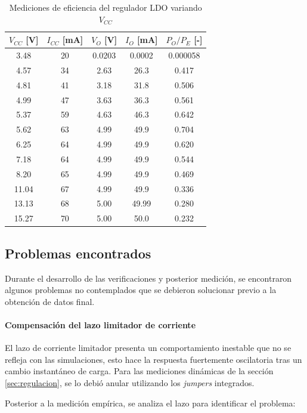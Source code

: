 \documentclass[]{article}
\begin{document}
\begin{table}[H]
	\centering
	\caption{Mediciones de eficiencia del regulador LDO variando $V_{CC}$}
	\begin{tabular}{|c|c|c|c|c|}
		\hline
		\textbf{$V_{CC}$ [V]} &
		\textbf{$I_{CC}$ [mA]} &
		\textbf{$V_O$ [V]} &
		\textbf{$I_O$ [mA]} &
		\textbf{$P_O/P_E$ [-]} \\
		\hline
		
		3.48  & 20 & 0.0203 & 0.0002 & 0.000058 \\
		4.57  & 34 & 2.63   & 26.3   & 0.417 \\
		4.81  & 41 & 3.18   & 31.8   & 0.506 \\
		4.99  & 47 & 3.63   & 36.3   & 0.561 \\
		5.37  & 59 & 4.63   & 46.3   & 0.642 \\
		5.62  & 63 & 4.99   & 49.9   & 0.704 \\
		6.25  & 64 & 4.99   & 49.9   & 0.620 \\
		7.18  & 64 & 4.99   & 49.9   & 0.544 \\
		8.20  & 65 & 4.99   & 49.9   & 0.469 \\
		11.04 & 67 & 4.99   & 49.9   & 0.336 \\
		13.13 & 68 & 5.00   & 49.99  & 0.280 \\
		15.27 & 70 & 5.00   & 50.0   & 0.232 \\
		\hline
	\end{tabular}
	\label{tab:eficiencia_ldo}
\end{table}

	\subsection{Problemas encontrados}
	Durante el desarrollo de las verificaciones y posterior medición, se encontraron algunos problemas no contemplados que se debieron solucionar previo a la obtención de datos final.
	\paragraph{Compensación del lazo limitador de corriente}\hfill\break
	El lazo de corriente limitador presenta un comportamiento inestable que no se refleja con las simulaciones, esto hace la respuesta fuertemente oscilatoria tras un cambio instantáneo de carga. Para las mediciones dinámicas de la sección \ref{sec:regulacion}, se lo debió anular utilizando los \textit{jumpers} integrados.
	
	Posterior a la medición empírica, se analiza el lazo para identificar el problema:
	
\end{document}
